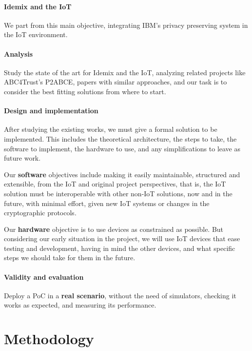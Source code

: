 \paragraph{Idemix and the IoT}
We part from this main objective, integrating IBM's privacy preserving system in the IoT environment. 

\paragraph{Analysis} Study the state of the art for Idemix and the IoT, analyzing related projects like ABC4Trust's \ac{P2ABCE}, papers with similar approaches, and our task is to consider the best fitting solutions from where to start.

\paragraph{Design and implementation} After studying the existing works, we must give a formal solution to be implemented. This includes the theoretical architecture, the steps to take, the software to implement, the hardware to use, and any simplifications to leave as future work.

Our \textbf{software} objectives include making it easily maintainable, structured and extensible, from the IoT and original project perspectives, that is, the IoT solution must be interoperable with other non-IoT solutions, now and in the future, with minimal effort, given new IoT systems or changes in the cryptographic protocols.

Our \textbf{hardware} objective is to use devices as constrained as possible. But considering our early situation in the project, we will use IoT devices that ease testing and development, having in mind the other devices, and what specific steps we should take for them in the future.

\paragraph{Validity and evaluation} Deploy a \ac{PoC} in a \textbf{real scenario}, without the need of simulators, checking it works as expected, and measuring its performance.



\section{Methodology}

